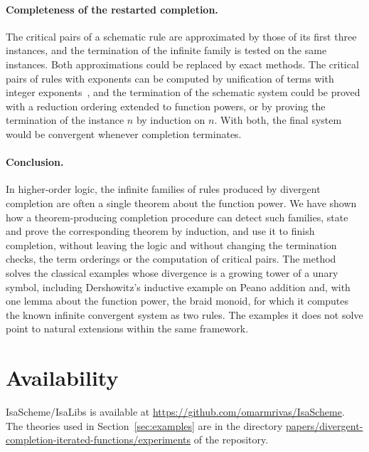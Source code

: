 \documentclass[preprint,12pt]{elsarticle}
\begin{document}
\paragraph{Completeness of the restarted completion.}
The critical pairs of a schematic rule are approximated by those of its
first three instances, and the termination of the infinite family is
tested on the same instances. Both approximations could be replaced by
exact methods. The critical pairs of rules with exponents can be computed
by unification of terms with integer exponents~\cite{Comon95}, and the
termination of the schematic system could be proved with a reduction
ordering extended to function powers, or by proving the termination of the
instance $n$ by induction on $n$. With both, the final system would be convergent whenever
completion terminates.

\paragraph{Conclusion.}
In higher-order logic, the infinite families of rules produced by
divergent completion are often a single theorem about the function power.
We have shown how a theorem-producing completion procedure can detect such
families, state and prove the corresponding theorem by induction, and use
it to finish completion, without leaving the logic and without changing
the termination checks, the term orderings or the computation of critical
pairs. The
method solves the classical examples whose divergence is a growing tower of
a unary symbol, including Dershowitz's inductive example on Peano addition
and, with one lemma about the function power, the braid monoid, for which
it computes the known infinite convergent system as two rules. The examples
it does not solve point to natural extensions within the same framework.

\section*{Availability}
{\sloppy
IsaScheme/IsaLibs is available at
\url{https://github.com/omarmrivas/IsaScheme}. The theories used in
Section~\ref{sec:examples} are in the directory
\url{papers/divergent-completion-iterated-functions/experiments} of the
repository.\par}



\end{document}
